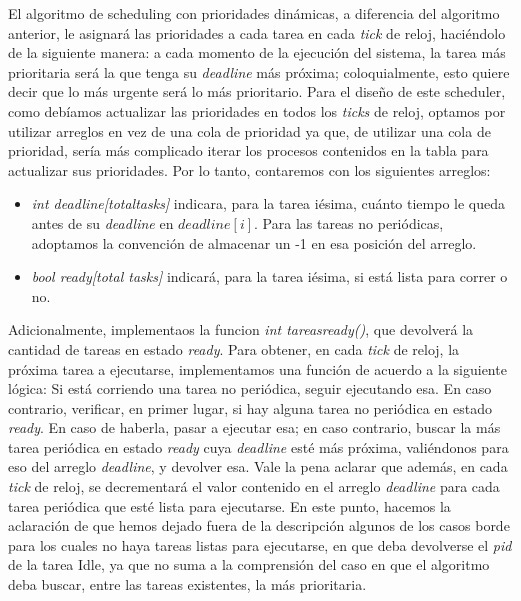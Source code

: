 El algoritmo de scheduling con prioridades din\'amicas, a diferencia del algoritmo anterior, le asignar\'a las prioridades a cada tarea en cada
\textit{tick} de reloj, haci\'endolo de la siguiente manera: a cada momento de la ejecuci\'on del sistema, la tarea m\'as prioritaria ser\'a la que
tenga su \textit{deadline} m\'as pr\'oxima; coloquialmente, esto quiere decir que lo m\'as urgente ser\'a lo m\'as prioritario. Para el dise\~no de
este scheduler, como deb\'iamos actualizar las prioridades en todos los \textit{ticks} de reloj, optamos por utilizar arreglos en vez de una cola de 
prioridad ya que, de utilizar una cola de prioridad, ser\'ia m\'as complicado iterar los procesos contenidos en la tabla para actualizar sus prioridades.
Por lo tanto, contaremos con los siguientes arreglos:

\begin{itemize}
  \item \textit{int deadline[totaltasks]} indicara, para la tarea i\'esima, cu\'anto tiempo le queda antes de su \textit{deadline} en $deadline[i]$. Para las tareas
  no peri\'odicas, adoptamos la convenci\'on de almacenar un -1 en esa posici\'on del arreglo.
  \item \textit{bool ready[total tasks]} indicar\'a, para la tarea i\'esima, si est\'a lista para correr o no.
\end{itemize}

Adicionalmente, implementaos la funcion \textit{int tareasready()}, que devolver\'a la cantidad de tareas en estado \textit{ready}.
Para obtener, en cada \textit{tick} de reloj, la pr\'oxima tarea a ejecutarse, implementamos una funci\'on de acuerdo a la siguiente l\'ogica:
Si est\'a corriendo una tarea no peri\'odica, seguir ejecutando esa. En caso contrario, verificar, en primer lugar, si hay alguna tarea
no peri\'odica en estado \textit{ready}. En caso de haberla, pasar a ejecutar esa; en caso contrario, buscar la m\'as tarea peri\'odica en estado
\textit{ready} cuya \textit{deadline} est\'e m\'as pr\'oxima, vali\'endonos para eso del arreglo \textit{deadline}, y devolver esa. Vale la pena aclarar
que adem\'as, en cada \textit{tick} de reloj, se decrementar\'a el valor contenido en el arreglo \textit{deadline} para cada tarea peri\'odica que est\'e
lista para ejecutarse. En este punto, hacemos la aclaraci\'on de que hemos dejado fuera de la descripci\'on algunos de los casos borde para los cuales no 
haya tareas listas para ejecutarse, en que deba devolverse el \textit{pid} de la tarea Idle, ya que no suma a la comprensi\'on del caso en que el algoritmo
deba buscar, entre las tareas existentes, la m\'as prioritaria.

